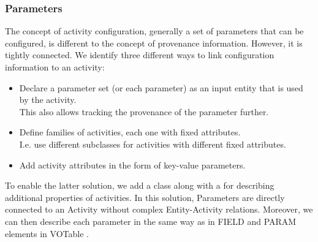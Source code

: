 



\subsubsection{Parameters}\label{sec:parameters}

The concept of activity configuration, generally a set of parameters that can be configured, is different to the concept of provenance information. However, it is tightly connected. We identify three different ways to link configuration information to an activity:
\begin{itemize}
\item Declare a parameter set (or each parameter) as an input entity that is used by the activity. \\
        This also allows tracking the provenance of the parameter further.
\item Define families of activities, each one with fixed attributes.\\
        I.e. use different subclasses for activities with different fixed attributes.
\item Add activity attributes in the form of key-value parameters.
\end{itemize}

To enable the latter solution, we add a  class along with a
 for describing additional properties of activities.
In this solution, Parameters are directly connected to an Activity without
complex Entity-Activity relations. Moreover, we can then describe each parameter
in the same way as in FIELD and PARAM elements in VOTable \citep{std:VOTABLE}.



